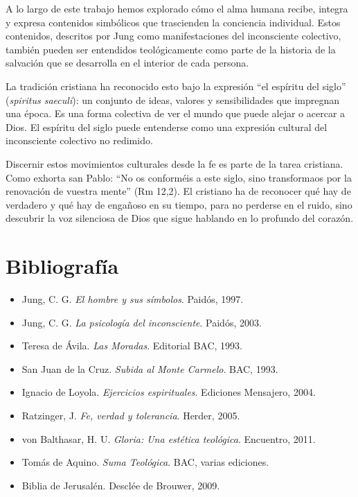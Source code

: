 \documentclass[12pt]{article}
\begin{document}
A lo largo de este trabajo hemos explorado cómo el alma humana recibe, integra y expresa contenidos simbólicos que trascienden la conciencia individual. Estos contenidos, descritos por Jung como manifestaciones del inconsciente colectivo, también pueden ser entendidos teológicamente como parte de la historia de la salvación que se desarrolla en el interior de cada persona.

La tradición cristiana ha reconocido esto bajo la expresión “el espíritu del siglo” (\textit{spiritus saeculi}): un conjunto de ideas, valores y sensibilidades que impregnan una época. Es una forma colectiva de ver el mundo que puede alejar o acercar a Dios. El espíritu del siglo puede entenderse como una expresión cultural del inconsciente colectivo no redimido.

Discernir estos movimientos culturales desde la fe es parte de la tarea cristiana. Como exhorta san Pablo: “No os conforméis a este siglo, sino transformaos por la renovación de vuestra mente” (Rm 12,2). El cristiano ha de reconocer qué hay de verdadero y qué hay de engañoso en su tiempo, para no perderse en el ruido, sino descubrir la voz silenciosa de Dios que sigue hablando en lo profundo del corazón.


\section*{Bibliografía}

\begin{itemize}
  \item Jung, C. G. \textit{El hombre y sus símbolos}. Paidós, 1997.
  \item Jung, C. G. \textit{La psicología del inconsciente}. Paidós, 2003.
  \item Teresa de Ávila. \textit{Las Moradas}. Editorial BAC, 1993.
  \item San Juan de la Cruz. \textit{Subida al Monte Carmelo}. BAC, 1993.
  \item Ignacio de Loyola. \textit{Ejercicios espirituales}. Ediciones Mensajero, 2004.
  \item Ratzinger, J. \textit{Fe, verdad y tolerancia}. Herder, 2005.
  \item von Balthasar, H. U. \textit{Gloria: Una estética teológica}. Encuentro, 2011.
  \item Tomás de Aquino. \textit{Suma Teológica}. BAC, varias ediciones.
  \item Biblia de Jerusalén. Desclée de Brouwer, 2009.
\end{itemize}
\end{document}
